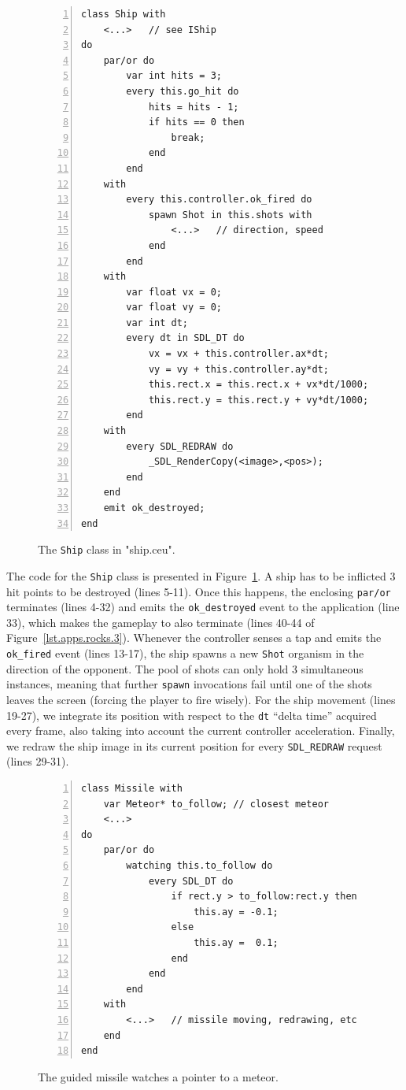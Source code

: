 \documentclass{sigplanconf}
\newcommand{\code}[1] {{\small{\texttt{#1}}}}
\newcommand{\1}{\;}
\newcommand{\2}{\;\;}
\newcommand{\3}{\;\;\;}
\newcommand{\5}{\;\;\;\;\;}
\begin{document}
\begin{figure}%
\begin{lstlisting}[numbers=left,xleftmargin=3em]
class Ship with
    <...>   // see IShip
do
    par/or do
        var int hits = 3;
        every this.go_hit do
            hits = hits - 1;
            if hits == 0 then
                break;
            end
        end
    with
        every this.controller.ok_fired do
            spawn Shot in this.shots with
                <...>   // direction, speed
            end
        end
    with
        var float vx = 0;
        var float vy = 0;
        var int dt;
        every dt in SDL_DT do
            vx = vx + this.controller.ax*dt;
            vy = vy + this.controller.ay*dt;
            this.rect.x = this.rect.x + vx*dt/1000;
            this.rect.y = this.rect.y + vy*dt/1000;
        end
    with
        every SDL_REDRAW do
            _SDL_RenderCopy(<image>,<pos>);
        end
    end
    emit ok_destroyed;
end
\end{lstlisting}
\caption{ The \code{Ship} class in "ship.ceu".
\label{lst.apps.rocks.4}
}
\end{figure}

The code for the \code{Ship} class is presented in 
Figure~\ref{lst.apps.rocks.4}.
%
A ship has to be inflicted 3 hit points to be destroyed (lines 5-11).
Once this happens, the enclosing \code{par/or} terminates (lines 4-32) and 
emits the \code{ok\_destroyed} event to the application (line 33), which makes 
the gameplay to also terminate (lines 40-44 of Figure~\ref{lst.apps.rocks.3}).
%
Whenever the controller senses a tap and emits the \code{ok\_fired} event 
(lines 13-17), the ship spawns a new \code{Shot} organism in the direction of 
the opponent.
The pool of shots can only hold 3 simultaneous instances, meaning that further
\code{spawn} invocations fail until one of the shots leaves the screen (forcing 
the player to fire wisely).
%
For the ship movement (lines 19-27), we integrate its position with respect to 
the \code{dt} ``delta time'' acquired every frame, also taking into account the 
current controller acceleration.
%
Finally, we redraw the ship image in its current position for every 
\code{SDL\_REDRAW} request (lines 29-31).

\begin{figure}%
\begin{lstlisting}[numbers=left,xleftmargin=3em]
class Missile with
    var Meteor* to_follow; // closest meteor
    <...>
do
    par/or do
        watching this.to_follow do
            every SDL_DT do
                if rect.y > to_follow:rect.y then
                    this.ay = -0.1;
                else
                    this.ay =  0.1;
                end
            end
        end
    with
        <...>   // missile moving, redrawing, etc
    end
end
\end{lstlisting}
\caption{ The guided missile watches a pointer to a meteor.
\label{lst.apps.rocks.5}
}
\end{figure}
\end{document}

